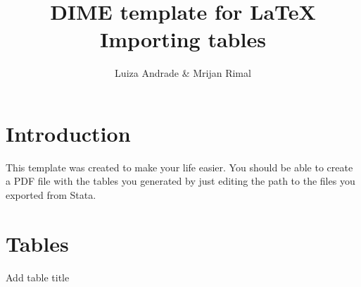 \documentclass{article}                 %
\title{DIME template for \LaTeX \\ Importing tables} 	%
\author{Luiza Andrade \& Mrijan Rimal}
\begin{document}

    \maketitle
    \tableofcontents        %
    \listoftables			%

    \newpage    
    \section{Introduction} %
    
        This template was created to make your life easier. You should be able to create a PDF file with the tables you generated by just editing the path to the files you exported from Stata.
     
    \section{Tables}

   		
           	   
		\begin{table}[H]
			\caption{Add table title}
			
		\end{table}
           
  
\end{document}
